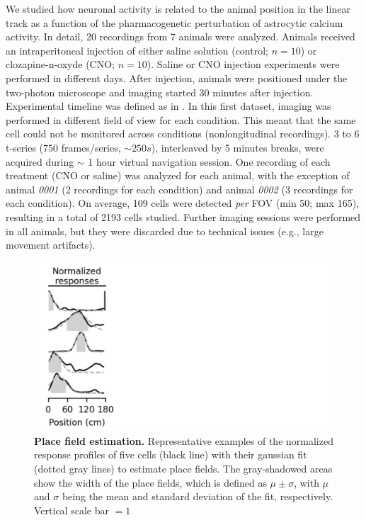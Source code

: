 We studied how neuronal activity is related to the animal position in the linear track as a function of the pharmacogenetic perturbation of astrocytic calcium activity.
In detail, 20 recordings from 7 animals were analyzed. 
Animals received an intraperitoneal injection of either saline solution (control; $n = 10$) or clozapine-n-oxyde (CNO; $n = 10$).
Saline or CNO injection experiments were performed in different days.
After injection, animals were positioned under the two-photon microscope and imaging started 30 minutes after injection.
Experimental timeline was defined as in \cite{adamsky2018astrocytic}.
In this first dataset, imaging was performed in different field of view for each condition.
This meant that the same cell could not be monitored across conditions (nonlongitudinal recordings).
3 to 6 t-series (750 frames/series, $\sim 250 s$), interleaved by 5 minutes breaks, were acquired during $\sim$ 1 hour virtual navigation session. 
One recording of each treatment (CNO or saline) was analyzed for each animal, with the exception of animal \textit{0001} (2 recordings for each condition) and animal \textit{0002} (3 recordings for each condition).
On average, 109 cells were detected \textit{per} FOV (min 50; max 165), resulting in a total of 2193 cells studied.
Further imaging sessions were performed in all animals, but they were discarded due to technical issues (e.g., large movement artifacts). 
\begin{figure}
    \includegraphics[trim={0 0 705 0},clip,width=.3\textwidth]{Figures/Chapter4/pf_gaussian_fitting.pdf}
    \caption[Place field estimation]{\textbf{Place field estimation.} Representative examples of the normalized response profiles of five cells (black line) with their gaussian fit (dotted gray lines) to estimate place fields. 
    The gray-shadowed areas show the width of the place fields, which is defined as $\mu \pm \sigma$, with $\mu$ and $\sigma$ being the mean and standard deviation of the fit, respectively.
    Vertical scale bar $= 1$}
    \label{fig:chap4:pf_gaussian_fitting}
\end{figure}

